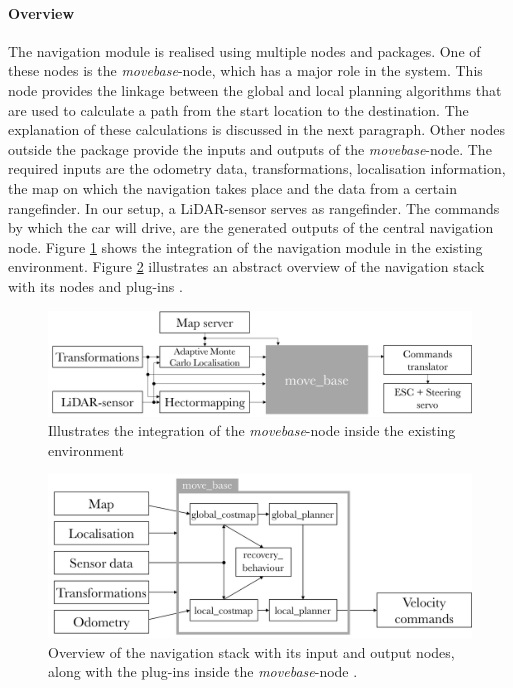 \documentclass[conference,a4paper]{IEEEtran}
\begin{document}
\paragraph{Overview}
The navigation module is realised using multiple nodes and packages. One of these nodes is the \emph{move\textunderscore base}-node, which has a major role in the system. This node provides the linkage between the global and local planning algorithms that are used to calculate a path from the start location to the destination. The explanation of these calculations is discussed in the next paragraph. Other nodes outside the package provide the inputs and outputs of the \emph{move\textunderscore base}-node. The required inputs are the odometry data, transformations, localisation information, the map on which the navigation takes place and the data from a certain rangefinder. In our setup, a LiDAR-sensor serves as rangefinder. The commands by which the car will drive, are the generated outputs of the central navigation node. Figure \ref{fig:navstack_overall} shows the integration of the navigation module in the existing environment. Figure \ref{fig:navstack_global} illustrates an abstract overview of the navigation stack with its nodes and plug-ins \cite{Marder-Eppstein2016}. 
\begin{figure}[!t]
	\includegraphics[width=\columnwidth]{navstack_overall}
	\centering
	\caption{Illustrates the integration of the \emph{move\textunderscore base}-node inside the existing environment}
	\label{fig:navstack_overall}
\end{figure}
\begin{figure}[!t]
	\includegraphics[width=\columnwidth]{navstack3}
	\centering
	\caption{Overview of the navigation stack with its input and output nodes, along with the plug-ins inside the \emph{move\textunderscore base}-node \cite{Marder-Eppstein2016}.}
	\label{fig:navstack_global}
\end{figure}
\end{document}

